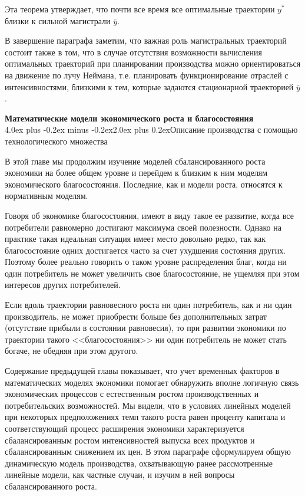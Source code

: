 \documentclass[12pt, 4paper]{book}
\makeatletter
\renewcommand{\section}{\@startsection{section}{1}{1pt}%
	{4.0ex plus -0.2ex minus -0.2ex}{2.0ex plus 0.2ex}{\centering\bf}}%
\makeatother
\begin{document}
{Эта теорема утверждает, что почти все время все оптимальные траектории $y^{*}$ близки к сильной магистрали $\bar{y}$.
\par

В завершение параграфа заметим, что важная роль магистральных траекторий состоит также в том, что в случае отсутствия возможности вычисления оптимальных траекторий при планировании производства можно ориентироваться на движение по лучу Неймана, т.е. планировать функционирование отраслей с интенсивностями, близкими к тем, которые задаются стационарной траекторией $\bar{y}$ .
\newpage
\begin{center}
\textbf{Математические модели экономического роста и благосостояния} \\
\section{Описание производства с помощью технологического множества}
\end{center}
\par

В этой главе мы продолжим изучение моделей сбалансированного роста экономики на более общем уровне и перейдем к близким к ним моделям экономического благосостояния. Последние, как и модели роста, относятся к нормативным моделям.
\par

Говоря об экономике благосостояния, имеют в виду такое ее развитие, когда все потребители равномерно достигают максимума своей полезности. Однако на практике такая идеальная ситуация имеет место довольно редко, так как благосостояние одних достигается часто за счет ухудшения состояния других. Поэтому более реально говорить о таком уровне распределения благ, когда ни один потребитель не может увеличить свое благосостояние, не ущемляя при этом интересов других потребителей.
\par

Если вдоль траектории равновесного роста ни один потребитель, как и ни один производитель, не может приобрести больше без дополнительных затрат (отсутствие прибыли в состоянии равновесия), то при развитии экономики по траектории такого <<благосостояния>> ни один потребитель не может стать богаче, не обедняя при этом другого.
\par

Содержание предыдущей главы показывает, что учет временных факторов в математических моделях экономики помогает обнаружить вполне логичную связь экономических процессов с естественным ростом производственных и потребительских возможностей. Мы видели, что в условиях линейных моделей при некоторых предположениях темп такого роста равен проценту капитала и соответствующий процесс расширения экономики характеризуется сбалансированным ростом интенсивностей выпуска всех продуктов и сбалансированным снижением их цен. В этом параграфе сформулируем общую динамическую модель производства, охватывающую ранее рассмотренные линейные модели, как частные случаи, и изучим в ней вопросы сбалансированного роста.
\par

}
\end{document}
